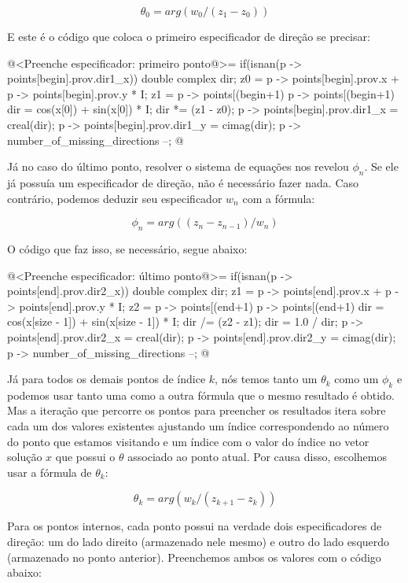 $$
\theta_0 = arg(w_0/(z_1-z_0))
$$

E este é o código que coloca o primeiro especificador de direção se
precisar:

\iniciocodigo
@<Preenche especificador: primeiro ponto@>=
if(isnan(p -> points[begin].prov.dir1_x)){
  double complex dir;
  z0 = p -> points[begin].prov.x + p -> points[begin].prov.y * I;
  z1 = p -> points[(begin+1) %
       p -> points[(begin+1) %
  dir = cos(x[0]) + sin(x[0]) * I;
  dir *= (z1 - z0);
  p -> points[begin].prov.dir1_x = creal(dir);
  p -> points[begin].prov.dir1_y = cimag(dir);
  p -> number_of_missing_directions --;
}
@
\fimcodigo

Já no caso do último ponto, resolver o sistema de equações nos revelou
$\phi_{n}$. Se ele já possuía um especificador de direção, não é
necessário fazer nada. Caso contrário, podemos deduzir seu
especificador $w_n$ com a fórmula:

$$
\phi_n = arg((z_n-z_{n-1})/w_n)
$$

O código que faz isso, se necessário, segue abaixo:

\iniciocodigo
@<Preenche especificador: último ponto@>=
if(isnan(p -> points[end].prov.dir2_x)){
  double complex dir;
  z1 = p -> points[end].prov.x + p -> points[end].prov.y * I;
  z2 = p -> points[(end+1) %
       p -> points[(end+1) %
  dir = cos(x[size - 1]) + sin(x[size - 1]) * I;
  dir /= (z2 - z1);
  dir = 1.0 / dir;
  p -> points[end].prov.dir2_x = creal(dir);
  p -> points[end].prov.dir2_y = cimag(dir);
  p -> number_of_missing_directions --;
}
@
\fimcodigo

Já para todos os demais pontos de índice $k$, nós temos tanto um
$\theta_k$ como um $\phi_k$ e podemos usar tanto uma como a outra
fórmula que o mesmo resultado é obtido. Mas a iteração que percorre os
pontos para preencher os resultados itera sobre cada um dos valores
existentes ajustando um índice  correspondendo ao número
do ponto que estamos visitando e um índice  com o
valor do índice no vetor solução $x$ que possui o $\theta$ associado
ao ponto atual. Por causa disso, escolhemos usar a fórmula de
$\theta_k$:

$$
\theta_k = arg(w_k/(z_{k+1}-z_k))
$$

Para os pontos internos, cada ponto possui na verdade dois
especificadores de direção: um do lado direito (armazenado nele mesmo)
e outro do lado esquerdo (armazenado no ponto anterior). Preenchemos
ambos os valores com o código abaixo:

